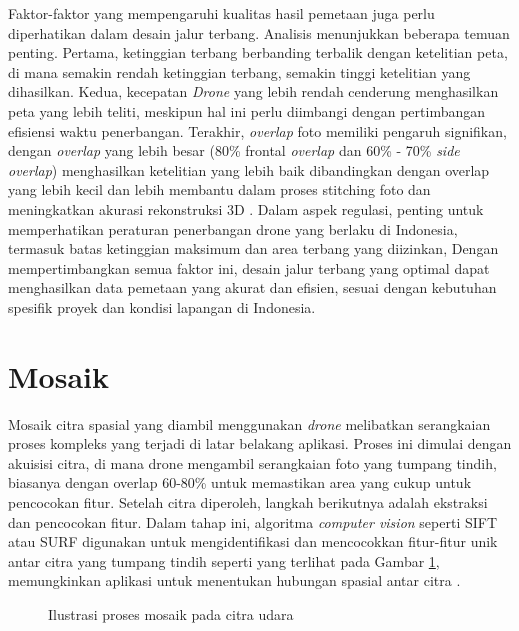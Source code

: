 Faktor-faktor yang mempengaruhi kualitas hasil pemetaan juga perlu diperhatikan dalam desain jalur terbang. Analisis menunjukkan beberapa temuan penting. Pertama, ketinggian terbang berbanding terbalik dengan ketelitian peta, di mana semakin rendah ketinggian terbang, semakin tinggi ketelitian yang dihasilkan. Kedua, kecepatan \textit{Drone} yang lebih rendah cenderung menghasilkan peta yang lebih teliti, meskipun hal ini perlu diimbangi dengan pertimbangan efisiensi waktu penerbangan. Terakhir, \textit{overlap} foto memiliki pengaruh signifikan, dengan \textit{overlap} yang lebih besar (80\% frontal \textit{overlap} dan 60\% - 70\% \textit{side overlap}) menghasilkan ketelitian yang lebih baik dibandingkan dengan overlap yang lebih kecil dan lebih membantu dalam proses stitching foto dan meningkatkan akurasi rekonstruksi 3D \citep{torres2018assessing}. Dalam aspek regulasi, penting untuk memperhatikan peraturan penerbangan drone yang berlaku di Indonesia, termasuk batas ketinggian maksimum dan area terbang yang diizinkan, Dengan mempertimbangkan semua faktor ini, desain jalur terbang yang optimal dapat menghasilkan data pemetaan yang akurat dan efisien, sesuai dengan kebutuhan spesifik proyek dan kondisi lapangan di Indonesia.

\section{Mosaik}

\par Mosaik citra spasial yang diambil menggunakan \textit{drone} melibatkan serangkaian proses kompleks yang terjadi di latar belakang aplikasi. Proses ini dimulai dengan akuisisi citra, di mana drone mengambil serangkaian foto yang tumpang tindih, biasanya dengan overlap 60-80\% untuk memastikan area yang cukup untuk pencocokan fitur. Setelah citra diperoleh, langkah berikutnya adalah ekstraksi dan pencocokan fitur. Dalam tahap ini, algoritma \textit{computer vision} seperti SIFT atau SURF digunakan untuk mengidentifikasi dan mencocokkan fitur-fitur unik antar citra yang tumpang tindih seperti yang terlihat pada Gambar \ref{mosaik}, memungkinkan aplikasi untuk menentukan hubungan spasial antar citra \citep{ghosh2016survey}.

\begin{figure}[H]
\centering
{}
\caption{Ilustrasi proses mosaik pada citra udara}
\label{mosaik}
\end{figure}

